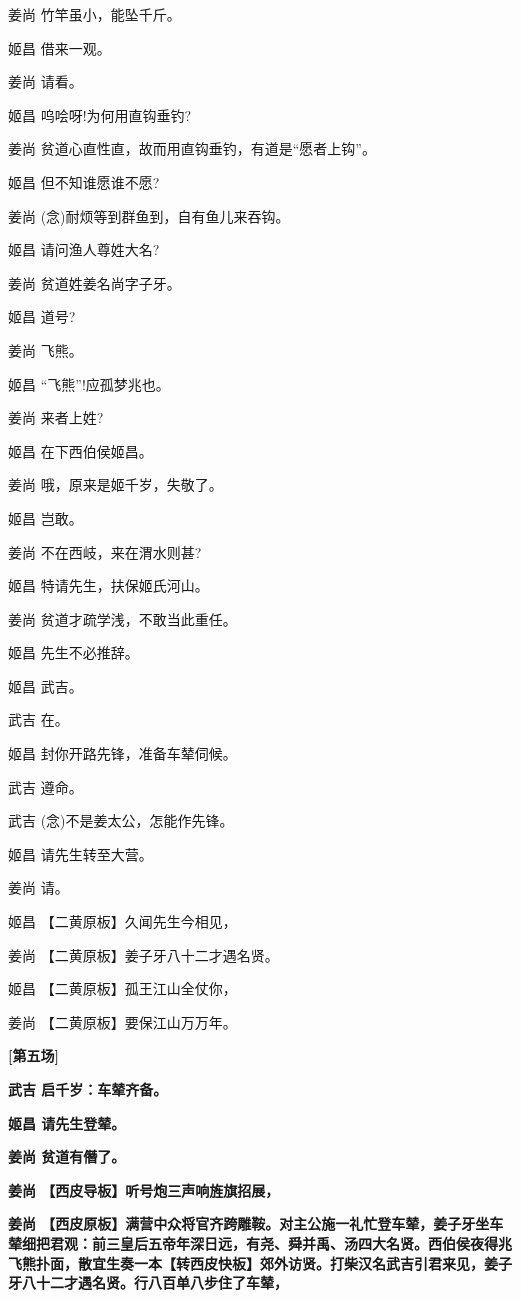 姜尚 竹竿虽小，能坠千斤。

姬昌 借来一观。

姜尚 请看。

姬昌 呜哙呀!为何用直钩垂钓?

姜尚 贫道心直性直，故而用直钩垂钓，有道是``愿者上钩''。

姬昌 但不知谁愿谁不愿?

姜尚 (念)耐烦等到群鱼到，自有鱼儿来吞钩。

姬昌 请问渔人尊姓大名?

姜尚 贫道姓姜名尚字子牙。

姬昌 道号?

姜尚 飞熊。

姬昌 ``飞熊''!应孤梦兆也。

姜尚 来者上姓?

姬昌 在下西伯侯姬昌。

姜尚 哦，原来是姬千岁，失敬了。

姬昌 岂敢。

姜尚 不在西岐，来在渭水则甚?

姬昌 特请先生，扶保姬氏河山。

姜尚 贫道才疏学浅，不敢当此重任。

姬昌 先生不必推辞。

姬昌 武吉。

武吉 在。

姬昌 封你开路先锋，准备车辇伺候。

武吉 遵命。

武吉 (念)不是姜太公，怎能作先锋。

姬昌 请先生转至大营。

姜尚 请。

姬昌 【二黄原板】久闻先生今相见，

姜尚 【二黄原板】姜子牙八十二才遇名贤。

姬昌 【二黄原板】孤王江山全仗你，

姜尚 【二黄原板】要保江山万万年。

\textbf{{[}第五场{]}}

\textbf{武吉 启千岁：车辇齐备。}

\textbf{姬昌 请先生登辇。}

\textbf{姜尚 贫道有僭了。}

\textbf{姜尚 【西皮导板】听号炮三声响旌旗招展，}

\textbf{姜尚
【西皮原板】满营中众将官齐跨雕鞍。对主公施一礼忙登车辇，姜子牙坐车辇细把君观：前三皇后五帝年深日远，有尧、舜并禹、汤四大名贤。西伯侯夜得兆飞熊扑面，散宜生奏一本【转西皮快板】郊外访贤。打柴汉名武吉引君来见，姜子牙八十二才遇名贤。行八百单八步住了车辇，}

